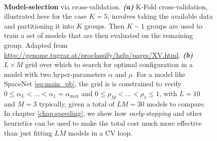 \begin{figure}
  \\
  \caption{\textbf{Model-selection} via cross-validation.
\textbf{\textit{(a)}} K-Fold cross-validation, illustrated
here for the case $K = 5$, involves
taking the available data and partitioning it into $K$ groups. Then
$K - 1$ groups are used to train a set of models that are then
evaluated on the remaining group. Adapted from \url{http://genome.tugraz.at/proclassify/help/pages/XV.html}.
\textbf{\textit{(b)}} $L \times M$ grid over which to search for optimal configuration in
a model with two hyper-parameters $\alpha$ and $\rho$. For a model like SpaceNet \eqref{eq:main_pb}, the grid is is constrained to verify $0 \le\alpha_L < \ldots < \alpha_1 = \alpha_{\text{max}}$ and $0 \le \rho_M < \ldots < \rho_1 \le 1$, with $L = 10$ and $M = 3$ typically, given a total of $LM = 30$ models to compare. In chapter \ref{chap:speeding}, we show how \textit{early-stopping} and other heuristics can be used to make the total cost much more effective than just fitting $LM$ models in a CV loop. }
  \label{fig:cv}
\end{figure}

